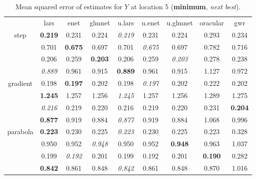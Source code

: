 \documentclass[authoryear, review, 11pt]{elsarticle}
\begin{document}
\begin{table}[ht]
\begin{center}
\begin{tabular}{ccccccccc}
  & lars & enet & glmnet & u.lars & u.enet & u.glmnet & oracular & gwr \\ 
  \cline{2-9}
  \multirow{4}{*}{step} & \textbf{0.219} & 0.231 & 0.224 & \emph{0.219} & 0.231 & 0.224 & 0.293 & 0.234 \\ 
  & 0.701 & \textbf{0.675} & 0.697 & 0.701 & \emph{0.675} & 0.697 & 0.782 & 0.716 \\ 
  & 0.206 & 0.259 & \textbf{0.203} & 0.206 & 0.259 & \emph{0.203} & 0.278 & 0.238 \\ 
  & \emph{0.889} & 0.961 & 0.915 & \textbf{0.889} & 0.961 & 0.915 & 1.127 & 0.972 \\ 
  \cline{2-9}
  \multirow{4}{*}{gradient} & 0.198 & \textbf{0.197} & 0.202 & 0.198 & \emph{0.197} & 0.202 & 0.222 & 0.202 \\ 
  & \textbf{1.245} & 1.257 & 1.256 & \emph{1.245} & 1.257 & 1.256 & 1.289 & 1.275 \\ 
  & \emph{0.216} & 0.219 & 0.220 & 0.216 & 0.219 & 0.220 & 0.231 & \textbf{0.204} \\ 
  & \textbf{0.877} & 0.919 & 0.884 & \emph{0.877} & 0.919 & 0.884 & 1.068 & 0.996 \\ 
  \cline{2-9}
  \multirow{4}{*}{parabola} & \textbf{0.223} & 0.230 & 0.225 & \emph{0.223} & 0.230 & 0.225 & 0.223 & 0.328 \\ 
  & 0.950 & 0.952 & \emph{0.948} & 0.950 & 0.952 & \textbf{0.948} & 0.963 & 1.037 \\ 
  & 0.199 & \emph{0.192} & 0.201 & 0.199 & 0.192 & 0.201 & \textbf{0.190} & 0.282 \\ 
  & \textbf{0.842} & 0.861 & 0.848 & \emph{0.842} & 0.861 & 0.848 & 0.870 & 1.016 \\ 
  \end{tabular}
\caption{Mean squared error of estimates for $Y$ at location 5 (\textbf{minimum}, \emph{next best}).\label{table:loc5-MSEY}}
\end{center}
\end{table}


	
\end{document}
